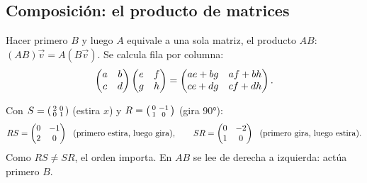 \documentclass[11pt,a4paper]{article}
\newcommand{\matdos}[4]{\mathchoice{\begin{pmatrix}#1 & #2\\ #3 & #4\end{pmatrix}}{\left(\begin{smallmatrix}#1 & #2\\ #3 & #4\end{smallmatrix}\right)}{\left(\begin{smallmatrix}#1 & #2\\ #3 & #4\end{smallmatrix}\right)}{\left(\begin{smallmatrix}#1 & #2\\ #3 & #4\end{smallmatrix}\right)}}
\begin{document}
\subsection{Composición: el producto de matrices}
\begin{definicion}
Hacer primero $B$ y luego $A$ equivale a una sola matriz, el producto $AB$: $(AB)\vec v=A(B\vec v)$. Se calcula fila por
columna:
\[ \matdos abcd\matdos efgh=\matdos{ae+bg}{af+bh}{ce+dg}{cf+dh}. \]
\end{definicion}
\begin{ejemplo}
Con $S=\matdos2001$ (estira $x$) y $R=\matdos0{-1}10$ (gira \ang{90}):
\[ RS=\matdos0{-1}20\ \ (\text{primero estira, luego gira}),\qquad SR=\matdos0{-2}10\ \ (\text{primero gira, luego estira}). \]
Como $RS\neq SR$, el orden importa. En $AB$ se lee de derecha a izquierda: actúa primero $B$.
\end{ejemplo}
\end{document}

